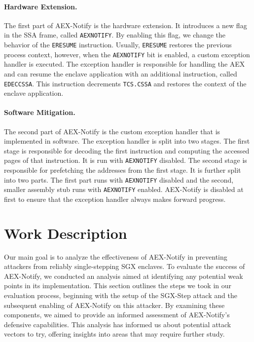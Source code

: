\documentclass{llncs}
\begin{document}
\paragraph{Hardware Extension.}
The first part of AEX-Notify is the hardware extension.
It introduces a new flag in the SSA frame, called \texttt{AEXNOTIFY}.
By enabling this flag, we change the behavior of the \texttt{ERESUME} instruction.
Usually, \texttt{ERESUME} restores the previous process context,
however, when the \texttt{AEXNOTIFY} bit is enabled,
a custom exception handler is executed.
The exception handler is responsible for handling the AEX and
can resume the enclave application with an additional instruction, called \texttt{EDECCSSA}.
This instruction decrements \texttt{TCS.CSSA} and restores the context of the enclave application.

\paragraph{Software Mitigation.}
The second part of AEX-Notify is the custom exception handler that is implemented in software.
The exception handler is split into two stages.
The first stage is responsible for decoding the first instruction and
computing the accessed pages of that instruction.
It is run with \texttt{AEXNOTIFY} disabled.
The second stage is responsible for prefetching the addresses from the first stage.
It is further split into two parts.
The first part runs with \texttt{AEXNOTIFY} disabled
and the second, smaller assembly stub runs with \texttt{AEXNOTIFY} enabled.
AEX-Notify is disabled at first to ensure that the exception handler always makes forward progress.

\section{Work Description}

Our main goal is to analyze the effectiveness of AEX-Notify
in preventing attackers from reliably single-stepping SGX enclaves.
To evaluate the success of AEX-Notify,
we conducted an analysis aimed at identifying any potential weak points in its implementation.
This section outlines the steps we took in our evaluation process,
beginning with the setup of the SGX-Step attack and
the subsequent enabling of AEX-Notify on this attacker.
By examining these components,
we aimed to provide an informed assessment of AEX-Notify’s defensive capabilities.
This analysis has informed us about potential attack vectors to try,
offering insights into areas that may require further study.
\end{document}
